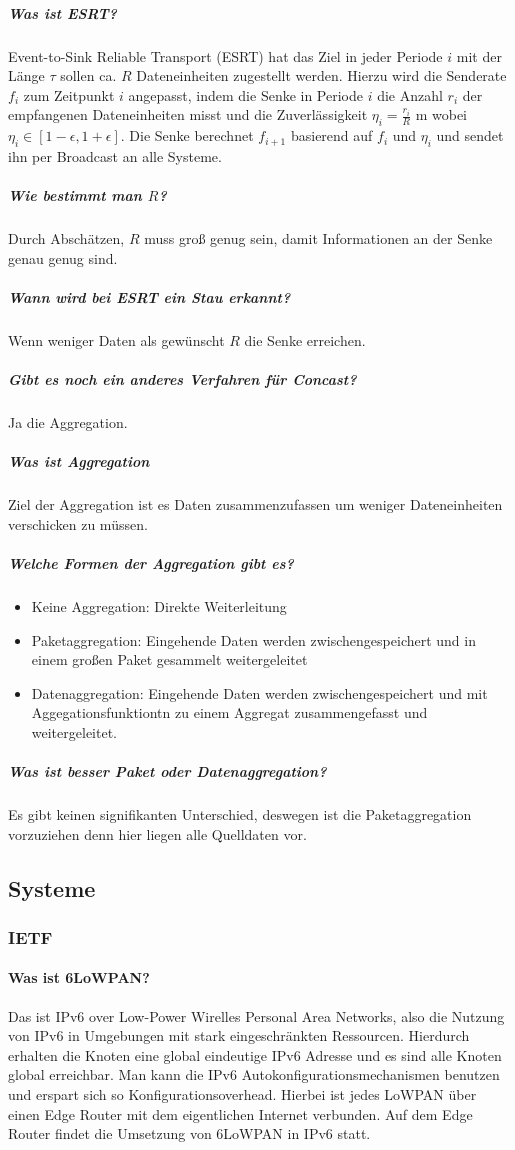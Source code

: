 	\subparagraph{Was ist ESRT?}
	Event-to-Sink Reliable Transport (ESRT) hat das Ziel in jeder Periode $i$ mit der Länge $\tau$ sollen ca. $R$ Dateneinheiten zugestellt werden. Hierzu wird die Senderate $f_i$ zum Zeitpunkt $i$ angepasst, indem die Senke in Periode $i$ die Anzahl $r_i$ der empfangenen Dateneinheiten misst und die Zuverlässigkeit $\eta_i=\frac{r_i}{R}$ m wobei $\eta_i \in [1-\epsilon, 1+\epsilon].$ Die Senke berechnet $f_{i+1}$ basierend auf $f_i$ und $\eta_i$ und sendet ihn per Broadcast an alle Systeme.
	\subparagraph{Wie bestimmt man $R$?}
	Durch Abschätzen, $R$ muss groß genug sein, damit Informationen an der Senke genau genug sind.
	\subparagraph{Wann wird bei ESRT ein Stau erkannt?}
	Wenn weniger Daten als gewünscht $R$ die Senke erreichen.
	
	\subparagraph{Gibt es noch ein anderes Verfahren für Concast?}
	Ja die Aggregation.
	
	\subparagraph{Was ist Aggregation}
	Ziel der Aggregation ist es Daten zusammenzufassen um weniger Dateneinheiten verschicken zu müssen.
	
	\subparagraph{Welche Formen der Aggregation gibt es?}
	\begin{itemize}
		\item Keine Aggregation: Direkte Weiterleitung
		\item Paketaggregation: Eingehende Daten werden zwischengespeichert und in einem großen Paket gesammelt weitergeleitet
		\item Datenaggregation: Eingehende Daten werden zwischengespeichert und mit Aggegationsfunktiontn zu einem Aggregat zusammengefasst und weitergeleitet.
\end{itemize}	 

	\subparagraph{Was ist besser Paket oder Datenaggregation?}
	Es gibt keinen signifikanten Unterschied, deswegen ist die Paketaggregation vorzuziehen denn hier liegen alle Quelldaten vor.
	
\subsection{Systeme}
\subsubsection{IETF}
	\paragraph{Was ist 6LoWPAN?}
	Das ist IPv6 over Low-Power Wirelles Personal Area Networks, also die Nutzung von IPv6 in Umgebungen mit stark eingeschränkten Ressourcen.
	Hierdurch erhalten die Knoten eine global eindeutige IPv6 Adresse und es sind alle Knoten global erreichbar. 
	Man kann die IPv6 Autokonfigurationsmechanismen benutzen und erspart sich so Konfigurationsoverhead.
	Hierbei ist jedes LoWPAN über einen Edge Router mit dem eigentlichen Internet verbunden. Auf dem Edge Router findet die Umsetzung von 6LoWPAN in IPv6 statt.
	
